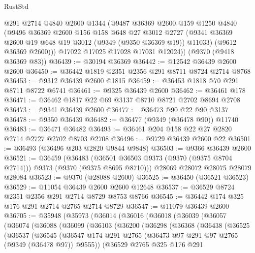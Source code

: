 \begin{lexlean}{RustStd}
\begin{coremodule}
{\begin{coremodule}
{{{{{{{{{{{{{{{{{{{{{{{{{{{{{{{{{{{{{{{        @291
        @2714
        @4840
        @2600
        @1344
        (@9487
          @36369
          @2600
          @159
          @1250
          @4840
          (@9496
            @36369
            @2600
            @156
            @158
            @648
            @27
            @3012
            @2727
            (@9341 @36369 @2600 @19 @648 @19 @3012 (@9349 (@9350 @36369 @19)) @11033)
            (@9612 @36369 @2600)))
        @17022
        @17025
        @17028
        @17031
        @12024))
    (@9370 (@9418 @36369 @83))
@36439 := @30194 @36369
@36442 := @12542 @36439 @2600 @2600
@36450 := @36442 @1819 @2351 @2356 @291 @8711 @8724 @2714 @8768
@36453 := @9312 @36439 @2600 @1815
@36459 := @36453 @1818 @70 @291 @8711 @8722 @6741
@36461 := @9325 @36439 @2600
@36462 := @36461 @178
@36471 := @36462 @1817 @22 @69 @3137 @8710 @8721 @2702 @8694 @2708
@36473 := @9341 @36439 @2600
@36477 := @36473 @90 @22 @90 @3137
@36478 := @9350 @36439
@36482 := @36477 (@9349 (@36478 @90)) @11740
@36483 := @36471 @36482
@36493 := @36461 @204 @158 @22 @27 @2820 @2714 @2727 @2702 @8703 @2708
@36496 := @9729 @36439 @2600 @22
@36501 := @36493 (@36496 @203 @2820 @9844 @9848)
@36503 := @9366 @36439 @2600
@36521 := @36459
    (@36483 (@36501 @36503 @9373 (@9370 (@9375 @8704 @2714))) @9373 (@9370 (@9375 @8695 @8710)))
    @28069
    @28072
    @28075
    @28079
    @28084
@36523 := @9370 (@28088 @2600)
@36525 := @36450 (@36521 @36523)
@36529 := @11054 @36439 @2600 @2600 @12648
@36537 := @36529 @8724 @2351 @2356 @291 @2714 @8729 @8753 @8766
@36545 := @36442 @174 @325 @176 @291 @2714 @2765 @2714 @8729
@36547 := @11079 @36439 @2600
@36705 := @35948
    (@35973
      (@36014
        (@36016
          (@36018
            (@36039
              (@36057
                (@36074
                  (@36088
                    (@36099
                      (@36103
                        (@36200
                          (@36298
                            (@36368
                              (@36438
                                (@36525
                                  (@36537
                                    (@36545
                                      (@36547
                                        @174
                                        @291
                                        @2765
                                        (@36473 @97 @291 @97 @2765 (@9349 (@36478 @97)) @9555))
                                      (@36529
                                        @2765
                                        @325
                                        @176
                                        @291
}}}}}}}}}}}}}}}}}}}}}}}}}}}}}}}}}}}}}}}
\end{coremodule}}
\end{coremodule}
\end{lexlean}
